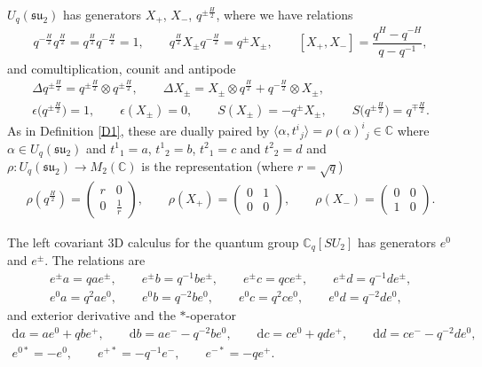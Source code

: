 \documentclass[pdftex]{sigma}
\numberwithin{equation}{section}
\newcommand{\extd}{\mathrm{d}}
\newcommand{\tens}{\mathop{\otimes}}
\newcommand{\C}{\mathbb{C}}
\newcommand{\<}{\langle}
\renewcommand{\>}{\rangle}
\begin{document}
\begin{Definition}
	$ U_{q}({\mathfrak{su}}_{2}) $ has generators $ X_{+}$, $X_{-}$, $q^{\pm \frac{H}{2}}$, where we have relations
	\begin{gather*}
	q^{-\frac{H}{2}} q^{\frac{H}{2}} = q^{\frac{H}{2}} q^{-\frac{H}{2}}=1, \qquad q^{\frac{H}{2}} X_{\pm} q^{-\frac{H}{2}}=q^{\pm} X_{\pm}, \qquad [X_{+}, X_{-}]= \dfrac{q^{H}- q^{-H}}{q-q^{-1}},
	\end{gather*}
	and comultiplication, counit and antipode
\begin{gather*}
		\Delta q^{\pm \frac{H}{2}}= q^{\pm \frac{H}{2}} \tens q^{\pm \frac{H}{2}}, \qquad \Delta X_{\pm} = X_{\pm} \tens q^{ \frac{H}{2}}+q^{-\frac{H}{2}} \tens X_{\pm},\\ \epsilon \big(q^{\pm \frac{H}{2}} \big)=1, \qquad \epsilon (X_{\pm})=0,\qquad
	S(X_{\pm})=-q^{\pm} X_{\pm}, \qquad S \big( q^{\pm \frac{H}{2}}\big)= q^{\mp \frac{H}{2}}.
\end{gather*}
As in Definition \ref{D1}, these are dually paired by $ 	\langle \alpha, t^{i} {}_{j}\rangle= \rho (\alpha)^{i} {}_{j} \in \C$ where $ \alpha \in U_{q}({\mathfrak{su}}_{2}) $ and $ t^{1}{}_{1}=a$, $t^{1}{}_{2}= b$, $t^{2}{}_{1}=c$ and $ t^{2}{}_{2}=d $ and $ \rho\colon U_{q}({\mathfrak{su}}_{2}) \rightarrow M_{2}(\C) $ is the representation (where $ r=\sqrt{q}$)
	\begin{gather*}
	\rho(q^{\frac{H}{2}} )=\left( \begin{matrix}
		r& 0\\
		0& \frac{1}{r}
	\end{matrix} \right), \qquad \rho (X_{+})= \left( \begin{matrix}
		0& 1 \\
		0& 0
	\end{matrix} \right), \qquad \rho (X_{-})= \left( \begin{matrix}
		0& 0\\
		1& 0
	\end{matrix} \right).
\end{gather*}
\end{Definition}
\begin{Definition} The left covariant $ 3 $D calculus for the quantum group $ \C_{q}[SU_{2}] $ has generators $ e^{0} $ and $ e^{\pm} $. The relations are
\begin{gather*}
	e^{\pm} a = q a e^{\pm},\qquad e^{\pm} b = q^{-1} b e^{\pm},\qquad e^{\pm} c = q c e^{\pm},\qquad e^{\pm} d = q^{-1} d e^{\pm},\\
	e^{0} a = q^{2} a e^{0},\qquad e^{0} b = q^{-2} b e^{0},\qquad e^{0} c = q^{2} c e^{0},\qquad e^{0} d = q^{-2} d e^{0},
\end{gather*}
and exterior derivative and the $*$-operator
\begin{gather*}
	\extd a = a e^{0}+q b e^{+},\qquad \extd b = a e^{-}-q^{-2} b e^{0}, \qquad 	\extd c =c e^{0}+ q d e^{+},\qquad \extd d = c e^{-}-q^{-2} d e^{0}, \\	e^{0*}= - e^{0}, \qquad e^{+*}= -q^{-1} e^{-}, \qquad e^{-*}= -q e^{+}.
\end{gather*}
\end{Definition}
\end{document}
